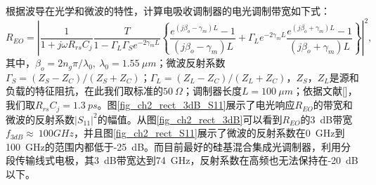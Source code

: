 根据波导在光学和微波的特性，计算电吸收调制器的电光调制带宽如下式\cite{li1999ultrahigh, tang2008design}：
\begin{equation}
\label{Equ:eoresponse}
R_{EO} = \left|\frac{1}{1+j\omega R_{rs} C_j}\frac{T}{1-\Gamma_L \Gamma_S  e^{-2 \gamma_m L} } \left\{\frac{e^{(j\beta_o-\gamma_m)L}-1}{(j\beta_o-\gamma_m)L}+\Gamma_L e^{-2\gamma_m L} \frac{e^{(j\beta_o+\gamma_m)L}-1}{(j\beta_o+\gamma_m)L} \right\} \right|^2,
\end{equation}
其中，$\beta_o = 2n_g\pi/\lambda_0,~\lambda_0 = 1.55~\mu m $；微波反射系数$\Gamma_S=(Z_S-Z_C)/(Z_S+Z_C)$；$\Gamma_L=(Z_L-Z_C)/(Z_L+Z_C)$，$Z_S$，$Z_L$是源和负载的特征阻抗，在此我们取标准的$50~ \Omega$；调制器长度$L = 100~ \mu m$；依据文献[]，我们取$R_{rs} C_j=1.3~ ps$。图\ref{fig_ch2_rect_3dB_S11}展示了电光响应$R_{EO}$的带宽和微波的反射系数$|S_{11}|^2$的幅值。从图\ref{fig_ch2_rect_3dB}可以看到$R_{EO}$的3~dB带宽$f_{3dB}\approx ~100 GHz$，并且图\ref{fig_ch2_rect_S11}展示了微波的反射系数在0~GHz到100~GHz的范围内都低于-25~dB。而目前最好的硅基混合集成光调制器，利用分段传输线式电极，其3~dB带宽达到74~GHz，反射系数在高频也无法保持在-20~dB以下\cite{tang2012over}。

